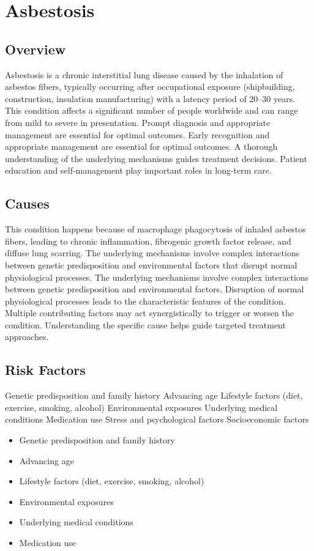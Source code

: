 \chapter{Asbestosis}
\label{sec:Asbestosis}

\section{Overview}
Asbestosis is a chronic interstitial lung disease caused by the inhalation of asbestos fibers, typically occurring after occupational exposure (shipbuilding, construction, insulation manufacturing) with a latency period of 20--30 years. This condition affects a significant number of people worldwide and can range from mild to severe in presentation. Prompt diagnosis and appropriate management are essential for optimal outcomes. Early recognition and appropriate management are essential for optimal outcomes. A thorough understanding of the underlying mechanisms guides treatment decisions. Patient education and self-management play important roles in long-term care.
\section{Causes}
This condition happens because of macrophage phagocytosis of inhaled asbestos fibers, leading to chronic inflammation, fibrogenic growth factor release, and diffuse lung scarring. The underlying mechanisms involve complex interactions between genetic predisposition and environmental factors that disrupt normal physiological processes. The underlying mechanisms involve complex interactions between genetic predisposition and environmental factors. Disruption of normal physiological processes leads to the characteristic features of the condition. Multiple contributing factors may act synergistically to trigger or worsen the condition. Understanding the specific cause helps guide targeted treatment approaches.
\section{Risk Factors}
Genetic predisposition and family history Advancing age Lifestyle factors (diet, exercise, smoking, alcohol) Environmental exposures Underlying medical conditions Medication use Stress and psychological factors Socioeconomic factors

\begin{itemize}[noitemsep]
  \item Genetic predisposition and family history
  \item Advancing age
  \item Lifestyle factors (diet, exercise, smoking, alcohol)
  \item Environmental exposures
  \item Underlying medical conditions
  \item Medication use
\end{itemize}
